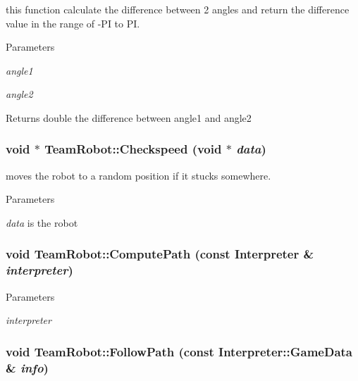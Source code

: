 this function calculate the difference between 2 angles and return the difference value in the range of -\/PI to PI. 


\begin{DoxyParams}{Parameters}
\item[{\em angle1}]\item[{\em angle2}]\end{DoxyParams}
\begin{DoxyReturn}{Returns}
double the difference between angle1 and angle2 
\end{DoxyReturn}
\hypertarget{classTeamRobot_ac52f7f240fde40db09116e8639a53c21}{
\subsubsection[{Checkspeed}]{\setlength{\rightskip}{0pt plus 5cm}void $\ast$ TeamRobot::Checkspeed (void $\ast$ {\em data})}}
\label{classTeamRobot_ac52f7f240fde40db09116e8639a53c21}


moves the robot to a random position if it stucks somewhere. 


\begin{DoxyParams}{Parameters}
\item[{\em data}]is the robot \end{DoxyParams}
\hypertarget{classTeamRobot_a9ae431d9eeaa1d16fa28c636499ab553}{
\subsubsection[{ComputePath}]{\setlength{\rightskip}{0pt plus 5cm}void TeamRobot::ComputePath (const {\bf Interpreter} \& {\em interpreter})}}
\label{classTeamRobot_a9ae431d9eeaa1d16fa28c636499ab553}

\begin{DoxyParams}{Parameters}
\item[{\em interpreter}]\end{DoxyParams}
\hypertarget{classTeamRobot_a02df00aae0a514badc93a9b2593be85f}{
\subsubsection[{FollowPath}]{\setlength{\rightskip}{0pt plus 5cm}void TeamRobot::FollowPath (const {\bf Interpreter::GameData} \& {\em info})}}
\label{classTeamRobot_a02df00aae0a514badc93a9b2593be85f}


